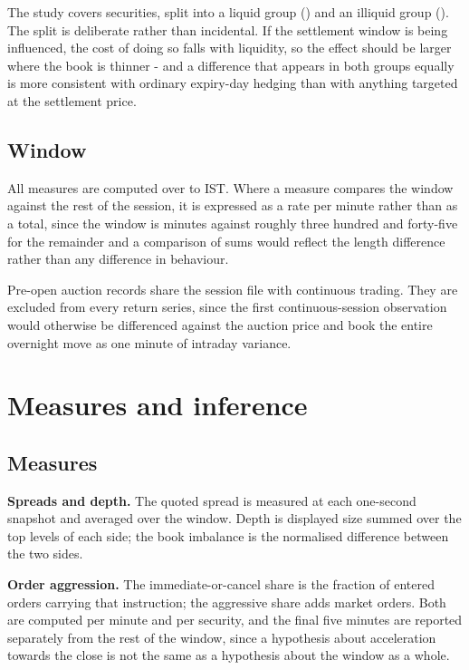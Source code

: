 \documentclass[11pt,a4paper]{article}
\begin{document}
The study covers \DesignSymbols{} securities, split into a liquid group
(\DesignLiquidList{}) and an illiquid group (\DesignIlliquidList{}). The split is
deliberate rather than incidental. If the settlement window is being influenced, the cost of
doing so falls with liquidity, so the effect should be larger where the book is thinner -
and a difference that appears in both groups equally is more consistent with ordinary
expiry-day hedging than with anything targeted at the settlement price.

\subsection{Window}

All measures are computed over \DesignWindowStart{} to \DesignWindowEnd{} IST. Where a
measure compares the window against the rest of the session, it is expressed as a rate per
minute rather than as a total, since the window is \DesignWindowMinutes{} minutes against
roughly three hundred and forty-five for the remainder and a comparison of sums would
reflect the length difference rather than any difference in behaviour.

Pre-open auction records share the session file with continuous trading. They are excluded
from every return series, since the first continuous-session observation would otherwise be
differenced against the auction price and book the entire overnight move as one minute of
intraday variance.


\section{Measures and inference}\label{sec:method}

\subsection{Measures}

\textbf{Spreads and depth.} The quoted spread is measured at each one-second snapshot and
averaged over the window. Depth is displayed size summed over the top \DesignReportedLevels{}
levels of each side; the book imbalance is the normalised difference between the two sides.

\textbf{Order aggression.} The immediate-or-cancel share is the fraction of entered orders
carrying that instruction; the aggressive share adds market orders. Both are computed per
minute and per security, and the final five minutes are reported separately from the rest of
the window, since a hypothesis about acceleration towards the close is not the same as a
hypothesis about the window as a whole.
\end{document}
